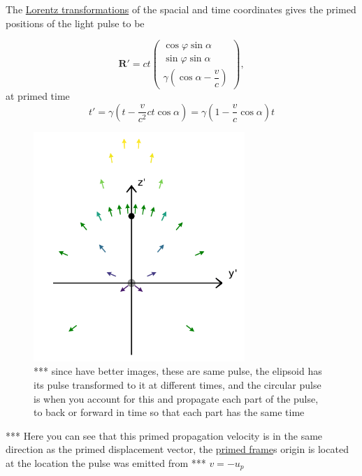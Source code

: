 The \hyperlink{def-lorentz-transform}{Lorentz transformations} of the spacial and time coordinates gives the primed positions of the light pulse to be

\begin{equation}%
	\label{displacement: primed pulse}
	\mathbf{R'} = c t
	\begin{pmatrix}
		\cos{\varphi}\sin{\alpha} \\ \sin{\varphi}\sin{\alpha} \\ \gamma\left(\cos{\alpha} - \dfrac{v}{c}\right)
	\end{pmatrix},
\end{equation}%
at primed time
\begin{equation}%
	t' = \gamma \left(t - \dfrac{v}{c^2}ct\cos{\alpha}\right) =  \gamma \left(1 - \frac{v}{c} \cos{\alpha}\right) t
\end{equation}%

\begin{figure}[H]
	\centering
	\includegraphics[width=8cm]{images/pdf/Prime_Pulse.pdf}
	\caption{*** since have better images, these are same pulse, the elipsoid has its pulse transformed to it at different times, and the circular pulse is when you account for this and propagate each part of the pulse, to back or forward in time so that each part has the same time}
	\label{fig: Prime Pulse}
\end{figure}

*** Here you can see that this primed propagation velocity is in the same direction as the primed displacement vector, the \hyperlink{def-Primed-Frame}{primed frame}s origin is located at the location the pulse was emitted from \newline
*** $v=-u_p$


